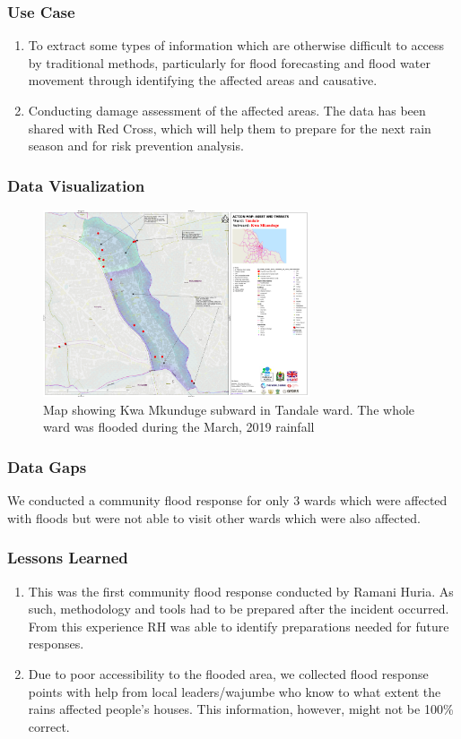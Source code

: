 \documentclass[a4paper,12pt,twoside]{article}
\begin{document}
\subsubsection{Use Case}
\begin{enumerate}
    \item To extract some types of information which are otherwise difficult to access by traditional methods, particularly for flood forecasting and flood water movement through identifying the affected areas and causative.
    \item Conducting damage assessment of the affected areas. The data has been shared with Red Cross, which will help them to prepare for the next rain season and for risk prevention analysis.
\end{enumerate}

\subsubsection{Data Visualization}
\begin{figure}[h]
	\color{RHgreen}\caption{Map showing Kwa Mkunduge subward in Tandale ward. The whole ward was flooded during the March, 2019 rainfall}
	\centering
	\includegraphics[width=0.7\textwidth]{images/Flood_Response_Data_Viz.png}
\end{figure}

\subsubsection{Data Gaps}
We conducted a community flood response for only 3 wards which were affected with floods but were not able to visit other wards which were also affected.

\subsubsection{Lessons Learned}
\begin{enumerate}
    \item This was the first community flood response conducted by Ramani Huria. As such, methodology and tools had to be prepared after the incident occurred. From this experience RH was able to identify preparations needed for future responses.
    \item Due to poor accessibility to the flooded area, we collected flood response points with help from local leaders/wajumbe who know to what extent the rains affected people’s houses. This information, however, might not be 100\% correct.
\end{enumerate}
\end{document}
